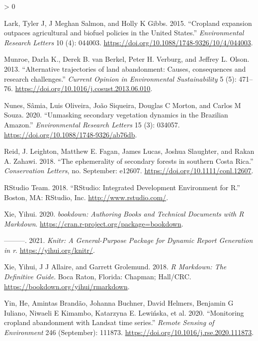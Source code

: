 \documentclass[
]{article}
\newlength{\cslhangindent}
\newenvironment{CSLReferences}[2] %
 {%
  \setlength{\parindent}{0pt}
  \ifodd #1 \everypar{\setlength{\hangindent}{\cslhangindent}}\ignorespaces\fi
  \ifnum #2 > 0
  \setlength{\parskip}{#2\baselineskip}
  \fi
 }%
 {}
\begin{document}
\begin{CSLReferences}{1}{0}
\leavevmode\hypertarget{ref-Lark2015}{}%
Lark, Tyler J, J Meghan Salmon, and Holly K Gibbs. 2015. {``{Cropland expansion outpaces agricultural and biofuel policies in the United States}.''} \emph{Environmental Research Letters} 10 (4): 044003. \url{https://doi.org/10.1088/1748-9326/10/4/044003}.

\leavevmode\hypertarget{ref-Munroe2013}{}%
Munroe, Darla K., Derek B. van Berkel, Peter H. Verburg, and Jeffrey L. Olson. 2013. {``{Alternative trajectories of land abandonment: Causes, consequences and research challenges}.''} \emph{Current Opinion in Environmental Sustainability} 5 (5): 471--76. \url{https://doi.org/10.1016/j.cosust.2013.06.010}.

\leavevmode\hypertarget{ref-Nunes2020}{}%
Nunes, Sâmia, Luis Oliveira, João Siqueira, Douglas C Morton, and Carlos M Souza. 2020. {``{Unmasking secondary vegetation dynamics in the Brazilian Amazon}.''} \emph{Environmental Research Letters} 15 (3): 034057. \url{https://doi.org/10.1088/1748-9326/ab76db}.

\leavevmode\hypertarget{ref-Reid2018}{}%
Reid, J. Leighton, Matthew E. Fagan, James Lucas, Joshua Slaughter, and Rakan A. Zahawi. 2018. {``{The ephemerality of secondary forests in southern Costa Rica}.''} \emph{Conservation Letters}, no. September: e12607. \url{https://doi.org/10.1111/conl.12607}.

\leavevmode\hypertarget{ref-RStudioTeam2018}{}%
RStudio Team. 2018. {``{RStudio: Integrated Development Environment for R}.''} Boston, MA: RStudio, Inc. \url{http://www.rstudio.com/}.

\leavevmode\hypertarget{ref-R-bookdown}{}%
Xie, Yihui. 2020. \emph{{bookdown: Authoring Books and Technical Documents with R Markdown}}. \url{https://cran.r-project.org/package=bookdown}.

\leavevmode\hypertarget{ref-R-knitr}{}%
---------. 2021. \emph{Knitr: A General-Purpose Package for Dynamic Report Generation in r}. \url{https://yihui.org/knitr/}.

\leavevmode\hypertarget{ref-rmarkdown2018}{}%
Xie, Yihui, J J Allaire, and Garrett Grolemund. 2018. \emph{{R Markdown: The Definitive Guide}}. Boca Raton, Florida: Chapman; Hall/CRC. \url{https://bookdown.org/yihui/rmarkdown}.

\leavevmode\hypertarget{ref-Yin2020}{}%
Yin, He, Amintas Brandão, Johanna Buchner, David Helmers, Benjamin G Iuliano, Niwaeli E Kimambo, Katarzyna E. Lewińska, et al. 2020. {``{Monitoring cropland abandonment with Landsat time series}.''} \emph{Remote Sensing of Environment} 246 (September): 111873. \url{https://doi.org/10.1016/j.rse.2020.111873}.

\end{CSLReferences}
\end{document}
